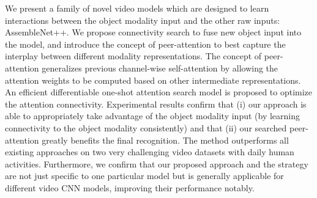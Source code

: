 \documentclass[runningheads]{llncs}
\begin{document}
We present a family of novel video models which are designed to learn interactions between the object modality input and the other raw inputs: AssembleNet++. We propose connectivity search to fuse new object input into the model, and introduce the concept of peer-attention to best capture the interplay between different modality representations. The concept of peer-attention generalizes previous channel-wise self-attention by allowing the attention weights to be computed based on other intermediate representations. An efficient differentiable one-shot attention search model is proposed to optimize the attention connectivity.
Experimental results confirm that (i) our approach is able to appropriately take advantage of the object modality input (by learning connectivity to the object modality consistently) and that (ii) our searched peer-attention greatly benefits the final recognition. The method outperforms all existing approaches on two very challenging video datasets with daily human activities.
Furthermore, we confirm that our proposed approach and the strategy are not just specific to one particular model but is generally applicable for different video CNN models, improving their performance notably.








\par\vfill\par

\clearpage


\end{document}
